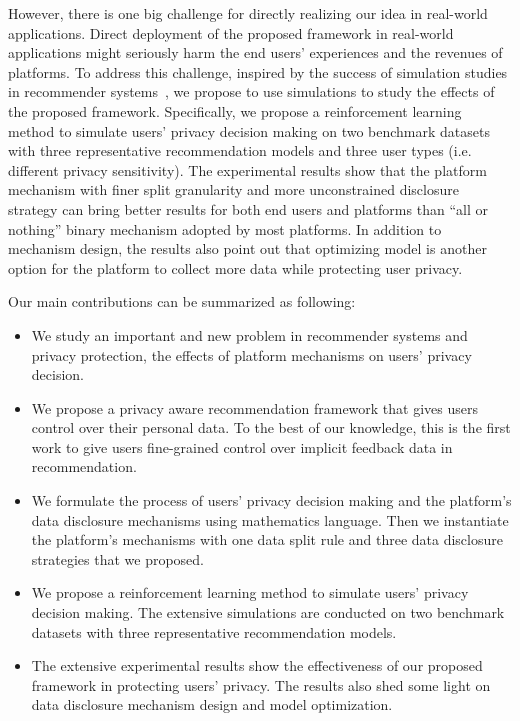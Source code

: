 However, there is one big challenge for directly realizing our idea in real-world applications.
Direct deployment of the proposed framework in real-world applications might seriously harm the end users’ experiences and the revenues of platforms.
To address this challenge, inspired by the success of simulation studies in recommender systems~\cite{Ie:arxiv19:RecSim,krauth2020offline,lucherini2021t,yao2021measuring}, we propose to use simulations to study the effects of the proposed framework.
Specifically, we propose a reinforcement learning method to simulate users' privacy decision making on two benchmark datasets with three representative recommendation models and three user types (i.e. different privacy sensitivity).
The experimental results show that the platform mechanism with finer split granularity and more unconstrained disclosure strategy can bring better results for both end users and platforms than ``all or nothing'' binary mechanism adopted by most platforms.
In addition to mechanism design, the results also point out that optimizing model is another option for the platform to collect more data while protecting user privacy.

Our main contributions can be summarized as following:
\begin{itemize} [itemsep=5pt, topsep=10pt,] %
    \item We study an important and new problem in recommender systems and privacy protection, the effects of platform mechanisms on users' privacy decision.
    \item We propose a privacy aware recommendation framework that gives users control over their personal data. To the best of our knowledge, this is the first work to give users fine-grained control over implicit feedback data in recommendation.
    \item We formulate the process of users' privacy decision making and the platform's data disclosure mechanisms using mathematics language. Then we instantiate the platform's mechanisms with one data split rule and three data disclosure strategies that we proposed. %
    \item We propose a reinforcement learning method to simulate users' privacy decision making. The extensive simulations are conducted on two benchmark datasets with three representative recommendation models.
    \item %
    The extensive experimental results show the effectiveness of our proposed framework in protecting users' privacy.
    The results also shed some light on data disclosure mechanism design and model optimization.
\end{itemize}












